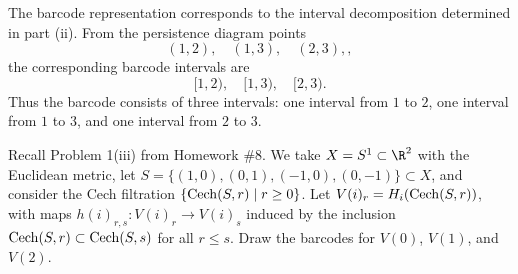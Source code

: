\begin{solution}[(iii)]
  The barcode representation corresponds to the interval decomposition determined in part (ii). From the persistence diagram points
  \[%
    (1,2), \quad (1,3), \quad (2,3),
  ,\]%
  the corresponding barcode intervals are
  \[%
    [1,2), \quad [1,3), \quad [2,3)
  .\]%
  Thus the barcode consists of three intervals: one interval from $1$ to $2$, one interval from $1$ to $3$, and one interval from $2$ to $3$.
\end{solution}

\begin{problem}[2]
  Recall Problem 1(iii) from Homework \#8. We take $X = S^1 \subset \R^2$ with the Euclidean metric, let $S = \{(1,0), (0,1), (-1,0), (0,-1)\} \subset X$, and consider the Cech filtration $\{\operatorname{Cech}(S, r) \mid r \geq 0\}$. Let $V(i)_r = H_i(\operatorname{Cech}(S, r))$, with maps $h(i)_{r,s} : V(i)_r \to V(i)_s$ induced by the inclusion $\operatorname{Cech}(S, r) \subset \operatorname{Cech}(S, s)$ for all $r \leq s$. Draw the barcodes for $V(0)$, $V(1)$, and $V(2)$.
\end{problem}

